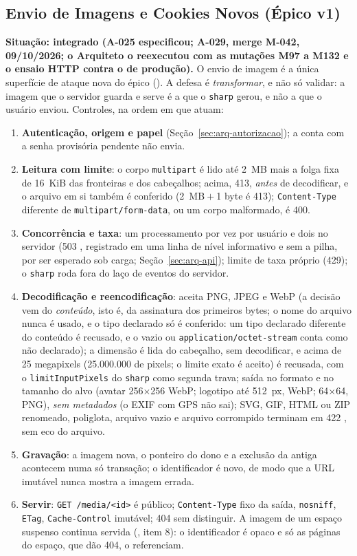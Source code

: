 \subsection{Envio de Imagens e Cookies Novos (Épico v1)}\label{sec:arq-upload}

\textbf{Situação: integrado (A-025 especificou; A-029, merge M-042, 09/10/2026; o Arquiteto o reexecutou com as mutações M97 a M132 e o ensaio HTTP contra o  de produção).} O envio de imagem é a única superfície de ataque nova do épico (). A defesa é \emph{transformar}, e não só validar: a imagem que o servidor guarda e serve é a que o \texttt{sharp} gerou, e não a que o usuário enviou. Controles, na ordem em que atuam:
\begin{enumerate}
  \item \textbf{Autenticação, origem e papel} (Seção~\ref{sec:arq-autorizacao}); a conta com a senha provisória pendente não envia.
  \item \textbf{Leitura com limite}: o corpo \texttt{multipart} é lido até 2~MB mais a folga fixa de 16~KiB das fronteiras e dos cabeçalhos; acima, 413, \emph{antes} de decodificar, e o arquivo em si também é conferido (2~MB${}+{}$1 byte é 413); \texttt{Content-Type} diferente de \texttt{multipart/form-data}, ou um corpo malformado, é 400.
  \item \textbf{Concorrência e taxa}: um processamento por vez por usuário e dois no servidor (503 , registrado em uma linha de nível informativo e sem a pilha, por ser esperado sob carga; Seção~\ref{sec:arq-api}); limite de taxa próprio (429); o \texttt{sharp} roda fora do laço de eventos do servidor.
  \item \textbf{Decodificação e reencodificação}: aceita PNG, JPEG e WebP (a decisão vem do \emph{conteúdo}, isto é, da assinatura dos primeiros bytes; o nome do arquivo nunca é usado, e o tipo declarado só é conferido: um tipo declarado diferente do conteúdo é recusado, e o vazio ou \texttt{application/octet-stream} conta como não declarado); a dimensão é lida do cabeçalho, sem decodificar, e acima de 25 megapixels (25.000.000 de pixels; o limite exato é aceito) é recusada, com o \texttt{limitInputPixels} do \texttt{sharp} como segunda trava; saída no formato e no tamanho do alvo (avatar 256$\times$256 WebP; logotipo até 512~px, WebP;  64$\times$64, PNG), \emph{sem metadados} (o EXIF com GPS não sai); SVG, GIF, HTML ou ZIP renomeado, poliglota, arquivo vazio e arquivo corrompido terminam em 422 , sem eco do arquivo.
  \item \textbf{Gravação}: a imagem nova, o ponteiro do dono e a exclusão da antiga acontecem numa só transação; o identificador é novo, de modo que a URL imutável nunca mostra a imagem errada.
  \item \textbf{Servir}: \texttt{GET /media/<id>} é público; \texttt{Content-Type} fixo da saída, \texttt{nosniff}, \texttt{ETag}, \texttt{Cache-Control} imutável; 404 sem distinguir. A imagem de um espaço suspenso continua servida (, item 8): o identificador é opaco e só as páginas do espaço, que dão 404, o referenciam.
\end{enumerate}
